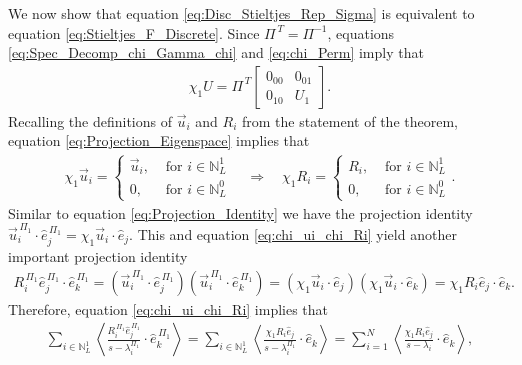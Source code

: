 \documentclass{cmslatex}
\begin{document}
We now show that equation \eqref{eq:Disc_Stieltjes_Rep_Sigma} is
equivalent to equation \eqref{eq:Stieltjes_F_Discrete}. Since
$\Pi^{\,T}=\Pi^{-1}$, equations \eqref{eq:Spec_Decomp_chi_Gamma_chi} and 
\eqref{eq:chi_Perm} imply that
%
\begin{align}\label{eq:Projection_Eigenspace}
  \chi_1U=\Pi^{\,T}\left[
  \begin{array}{ccc}
    0_{00}&0_{01}\\
    0_{10}&U_1  
    \end{array}
\right].
\end{align}
%
Recalling the definitions of $\vec{u}_i$ and $R_i$ from the
statement of the theorem, equation \eqref{eq:Projection_Eigenspace}
implies that 
%
\begin{align}\label{eq:chi_ui_chi_Ri}
  \chi_1\vec{u}_i=
  \begin{cases}
  \vec{u}_i, &\text{ for } i\in\mathbb{N}_L^1  \\
  0,        &\text{ for } i\in\mathbb{N}_L^0
  \end{cases}
  \quad \Rightarrow \quad
   \chi_1R_i=
  \begin{cases}
  R_i, &\text{ for } i\in\mathbb{N}_L^1  \\
  0,  &\text{ for } i\in\mathbb{N}_L^0
  \end{cases}.
\end{align}
%
Similar to equation \eqref{eq:Projection_Identity} we have the
projection identity
$\vec{u}_i^{\,\Pi_1}\cdot\hat{e}_j^{\,\Pi_1}=\chi_1\vec{u}_i\cdot\hat{e}_j$. This and
equation \eqref{eq:chi_ui_chi_Ri} yield another important projection
identity 
%
\begin{align*}
  R_i^{\,\Pi_1}\hat{e}_j^{\,\Pi_1}\cdot\hat{e}_k^{\,\Pi_1}
  =
   (\vec{u}_i^{\,\Pi_1}\cdot\hat{e}_j^{\,\Pi_1})(\vec{u}_i^{\,\Pi_1}\cdot\hat{e}_k^{\,\Pi_1}) 
  =(\chi_1\vec{u}_i\cdot\hat{e}_j)(\chi_1\vec{u}_i\cdot\hat{e}_k)
  =\chi_1R_i\hat{e}_j\cdot\hat{e}_k.
\end{align*}
%
Therefore, equation \eqref{eq:chi_ui_chi_Ri} implies that
%
\begin{align*}
 \sum_{i\in\mathbb{N}_L^1}\left\langle
          \frac{R_i^{\,\Pi_1}\hat{e}_j^{\,\Pi_1}}{s-\lambda_i^{\Pi_1}}\cdot\hat{e}_k^{\,\Pi_1}
          \right\rangle 
 =
 \sum_{i\in\mathbb{N}_L^1}\left\langle
          \frac{\chi_1R_i\hat{e}_j}{s-\lambda_i^{\Pi_1}}\cdot\hat{e}_k
          \right\rangle 
          =
 \sum_{i=1}^N\left\langle
          \frac{\chi_1R_i\hat{e}_j}{s-\lambda_i}\cdot\hat{e}_k
          \right\rangle ,
\end{align*}
\end{document}
